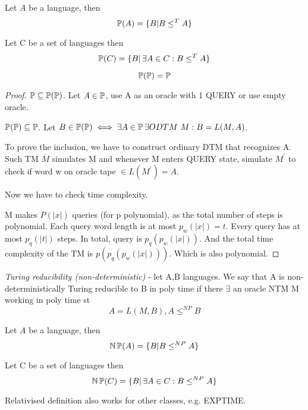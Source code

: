 \begin{definition}
	Let $A$ be a language, then
	\[ \operatorname{\mathbb{P}}(A) = \{ B | B \leq^T A \} \]
\end{definition}
\begin{definition}
	Let C be a set of languages then
	\[ \operatorname{\mathbb{P}}(C) = \{ B |\, \exists A \in C: B \leq^T A \} \]
\end{definition}

\begin{observation}
	\[ \operatorname{\mathbb{P}}(\operatorname{\mathbb{P}}) = \operatorname{\mathbb{P}} \]
\end{observation}
\begin{proof}
	$ \operatorname{\mathbb{P}} \subseteq \operatorname{\mathbb{P}}(\operatorname{\mathbb{P}})$. Let $A \in \operatorname{\mathbb{P}}$, use A as an oracle with 1 QUERY or use empty oracle.

	$\operatorname{\mathbb{P}}(\operatorname{\mathbb{P}}) \subseteq \operatorname{\mathbb{P}}$. Let $B \in \TP(\TP) \iff \exists A \in \TP \exists ODTM\ M: B = L(M, A)$.

	To prove the inclusion, we have to construct ordinary DTM that recognizes A.
	Such TM $\overline{M}$ simulates M and whenever M enters QUERY state, simulate $M^{\prime}$ to check if word w on oracle tape $\in L(M^{\prime}) = A$.

	Now we have to check time complexity.

	M makes $P(|x|)$ queries (for p polynomial), as the total number of steps is polynomial.
	Each query word length is at most $p_w(|x|) = t$.
	Every query has at most $p_q(|t|)$ steps.
	In total, query is $p_q(p_w(|x|))$.
	And the total time complexity of the TM is $p(p_q(p_w(|x|)))$.
	Which is also polynomial.
\end{proof}

\begin{definition}
	\emph{Turing reducibility (non-deterministic)} - let A,B languages.
	We say that A is non-deterministically Turing reducible to B in poly time if there $\exists$ an oracle NTM M working in poly time st
	\[ A = L(M, B), A \leq^{NP} B \]
\end{definition}

\begin{definition}
	Let $A$ be a language, then
	\[ \operatorname{\operatorname{\mathbb{N}}\mathbb{P}}(A) = \{ B | B \leq^{NP} A \} \]
\end{definition}
\begin{definition}
	Let C be a set of languages then
	\[ \operatorname{\operatorname{\mathbb{N}}\mathbb{P}}(C) = \{ B |\, \exists A \in C: B \leq^{NP} A \} \]
\end{definition}

\begin{note}
	Relativised definition also works for other classes, e.g. EXPTIME.
\end{note}

